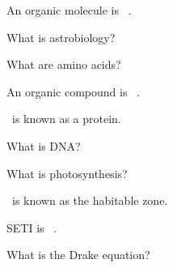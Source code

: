 \documentclass[addpoints]{exam}
\begin{document}
\begin{questions}


\question
An organic molecule is \fillin\ .

\question
What is astrobiology?

\question
What are amino acids?

\question
An organic compound is \fillin\ .

\question
\fillin\ is known as a protein.

\question
What is DNA?

\question
What is photosynthesis?

\question
\fillin\ is known as the habitable zone.

\question
SETI is \fillin\ .

\question
What is the Drake equation?

\end{questions}
\end{document}
